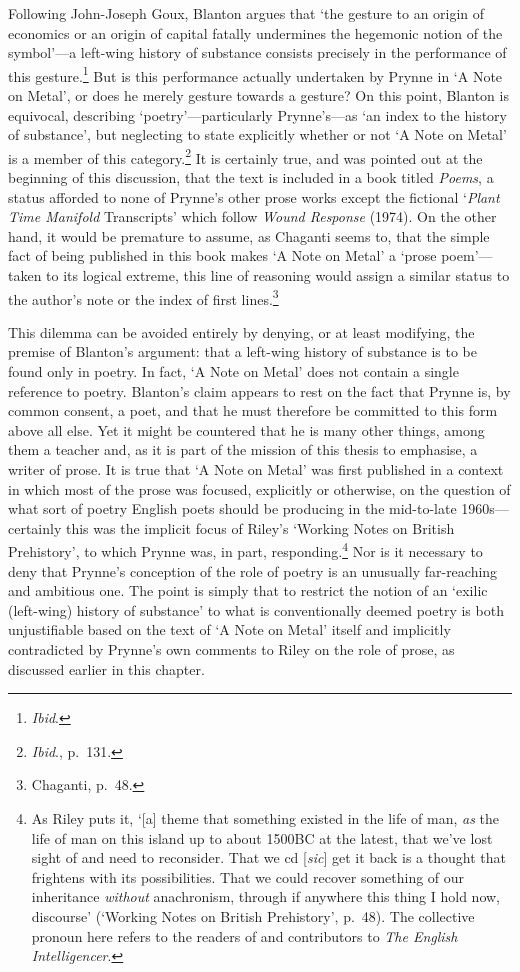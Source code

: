 \documentclass[]{article}
\begin{document}
Following John-Joseph Goux, Blanton argues that `the gesture to an
origin of economics or an origin of capital fatally undermines the
hegemonic notion of the symbol'---a left-wing history of substance
consists precisely in the performance of this gesture.\footnote{\emph{Ibid}.}
But is this performance actually undertaken by Prynne in `A Note on
Metal', or does he merely gesture towards a gesture? On this point,
Blanton is equivocal, describing `poetry'---particularly Prynne's---as
`an index to the history of substance', but neglecting to state
explicitly whether or not `A Note on Metal' is a member of this
category.\footnote{\emph{Ibid}., p.~131.} It is certainly true, and was
pointed out at the beginning of this discussion, that the text is
included in a book titled \emph{Poems}, a status afforded to none of
Prynne's other prose works except the fictional `\emph{Plant Time
Manifold} Transcripts' which follow \emph{Wound Response} (1974). On the
other hand, it would be premature to assume, as Chaganti seems to, that
the simple fact of being published in this book makes `A Note on Metal'
a `prose poem'---taken to its logical extreme, this line of reasoning
would assign a similar status to the author's note or the index of first
lines.\footnote{Chaganti, p.~48.}

This dilemma can be avoided entirely by denying, or at least modifying,
the premise of Blanton's argument: that a left-wing history of substance
is to be found only in poetry. In fact, `A Note on Metal' does not
contain a single reference to poetry. Blanton's claim appears to rest on
the fact that Prynne is, by common consent, a poet, and that he must
therefore be committed to this form above all else. Yet it might be
countered that he is many other things, among them a teacher and, as it
is part of the mission of this thesis to emphasise, a writer of prose.
It is true that `A Note on Metal' was first published in a context in
which most of the prose was focused, explicitly or otherwise, on the
question of what sort of poetry English poets should be producing in the
mid-to-late 1960s---certainly this was the implicit focus of Riley's
`Working Notes on British Prehistory', to which Prynne was, in part,
responding.\footnote{As Riley puts it, `{[}a{]} theme that something
  existed in the life of man, \emph{as} the life of man on this island
  up to about 1500BC at the latest, that we've lost sight of and need to
  reconsider. That we cd {[}\emph{sic}{]} get it back is a thought that
  frightens with its possibilities. That we could recover something of
  our inheritance \emph{without} anachronism, through if anywhere this
  thing I hold now, discourse' (`Working Notes on British Prehistory',
  p.~48). The collective pronoun here refers to the readers of and
  contributors to \emph{The English Intelligencer}.} Nor is it necessary
to deny that Prynne's conception of the role of poetry is an unusually
far-reaching and ambitious one. The point is simply that to restrict the
notion of an `exilic (left-wing) history of substance' to what is
conventionally deemed poetry is both unjustifiable based on the text of
`A Note on Metal' itself and implicitly contradicted by Prynne's own
comments to Riley on the role of prose, as discussed earlier in this
chapter.
\end{document}
